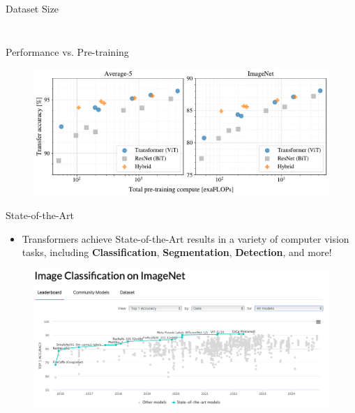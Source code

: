 \begin{frame}{Dataset Size}
\begin{columns}
\begin{column}{0.5\textwidth}
\begin{figure}
                \label{fig:imagenet_5shot}
            \end{figure}
        \end{column}
    \end{columns}
\end{frame}


\begin{frame}{Performance vs. Pre-training}
    \begin{figure}
        \centering
        \includegraphics[width=0.9\linewidth]{pic/finetune_vs_compute2.pdf}
        \label{fig:enter-label}
    \end{figure}
\end{frame}


\begin{frame}{State-of-the-Art}
    \begin{itemize}
        \item Transformers achieve State-of-the-Art results in a variety of computer vision tasks, including \textbf{Classification}, \textbf{Segmentation}, \textbf{Detection}, and more!
    \end{itemize}
    \begin{figure}
        \centering
        \includegraphics[width=\linewidth]{pic/SOTA.png}
        \label{fig:sota}
    \end{figure}
\end{frame}

